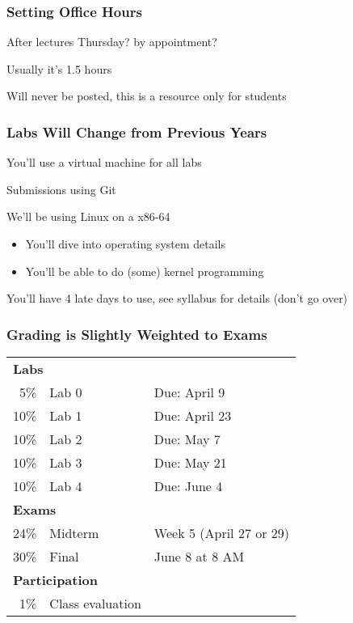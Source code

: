   \begin{frame}
    \frametitle{Setting Office Hours}

    After lectures Thursday? by appointment?

    \vspace{2em}

    Usually it's 1.5 hours

    \vspace{2em}

    Will never be posted, this is a resource only for students
  \end{frame}

  \begin{frame}
    \frametitle{Labs Will Change from Previous Years}

    You'll use a virtual machine for all labs

    \vspace{2em}

    Submissions using Git

    \vspace{2em}

    We'll be using Linux on a x86-64

    \begin{itemize}
      \item You'll dive into operating system details
      \item You'll be able to do (some) kernel programming
    \end{itemize}

    \vspace{2em}

    You'll have 4 late days to use, see syllabus for details (don't go over)
  \end{frame}

  \begin{frame}
    \frametitle{Grading is Slightly Weighted to Exams}

    \begin{tabular}{rll}
      \multicolumn{2}{l}{\bfseries Labs} \\
       5\% & Lab 0 & Due: April 9 \\
      10\% & Lab 1 & Due: April 23 \\
      10\% & Lab 2 & Due: May 7 \\
      10\% & Lab 3 & Due: May 21\\
      10\% & Lab 4 & Due: June 4 \\
      \multicolumn{2}{l}{\bfseries Exams} \\
      24\% & Midterm & Week 5 (April 27 or 29) \\
      30\% & Final & June 8 at 8 AM\\
      \multicolumn{2}{l}{\bfseries Participation} \\
       1\% & Class evaluation \\
    \end{tabular}
  \end{frame}


